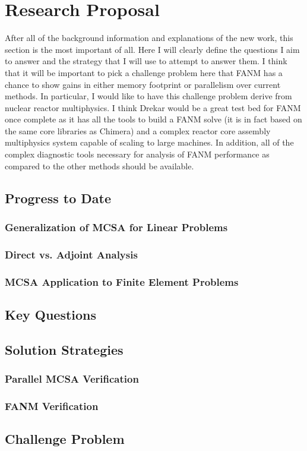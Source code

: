 \chapter{Research Proposal}
\label{ch:research_proposal}

After all of the background information and explanations of the new
work, this section is the most important of all. Here I will clearly
define the questions I aim to answer and the strategy that I will use
to attempt to answer them. I think that it will be important to pick a
challenge problem here that FANM has a chance to show gains in either
memory footprint or parallelism over current methods. In particular, I
would like to have this challenge problem derive from nuclear reactor
multiphysics. I think Drekar would be a great test bed for FANM once
complete as it has all the tools to build a FANM solve (it is in fact
based on the same core libraries as Chimera) and a complex reactor
core assembly multiphysics system capable of scaling to large
machines. In addition, all of the complex diagnostic tools necessary
for analysis of FANM performance as compared to the other methods
should be available. 

\section{Progress to Date}
\label{sec:progress}

\subsection{Generalization of MCSA for Linear Problems}
\label{subsec:mcsa_generalization}

\subsection{Direct vs. Adjoint Analysis}
\label{subsec:mcsa_direct_vs_adjoint}

\subsection{MCSA Application to Finite Element Problems}
\label{subsec:mcsa_finite_element}

\section{Key Questions}
\label{sec:key_questions}

\section{Solution Strategies}
\label{sec:solution_strategies}

\subsection{Parallel MCSA Verification}
\label{subsubsec:mcsa_verification}

\subsection{FANM Verification}
\label{subsubsec:fanm_verification}

\section{Challenge Problem}
\label{sec:challenge_problem}
